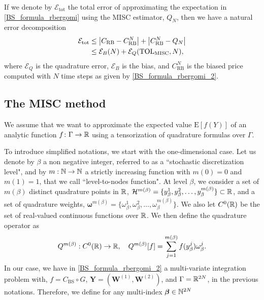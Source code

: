 If we denote by $\mathcal{E}_{\text{tot}}$ the total error of approximating the  expectation in \eqref{BS_formula_rbergomi} using the MISC estimator, $Q_N$, then we have a natural error decomposition
\begin{align}\label{eq:total_error}
\mathcal{E}_{\text{tot}} & \le \left\lvert C_{\text{RB}}-C_{\text{RB}}^N\right\rvert+\left\lvert C_{\text{RB}}^N-Q_{N}\right\rvert\nonumber\\
  & \le \mathcal{E}_B(N)+ \mathcal{E}_Q(\text{TOL}_{\text{MISC}},N),
\end{align}
where  $\mathcal{E}_Q$ is the quadrature error, $\mathcal{E}_B$  is the bias, and $C_{\text{RB}}^N$ is the biased price computed with $N$ time steps as given by \eqref{BS_formula_rbergomi_2}.

\subsection{The MISC method}\label{sec:Details of the MISC}

We assume that we want to approximate the expected value $\text{E}[f(Y)]$ of an analytic function $f\colon \Gamma \to \mathbb{R}$ using a tensorization of quadrature formulas over $\Gamma$.

To introduce simplified notations, we start with the one-dimensional case. Let us denote by $\beta$ a non negative integer, referred to as a ``stochastic discretization level", and by $m: \mathbb{N} \rightarrow \mathbb{N}$  a strictly increasing function with $m(0)=0$ and $m(1)=1$, that we call  ``level-to-nodes function". At level $\beta$, we consider a set of $m(\beta)$ distinct quadrature points in $\mathbb{R}$, $\mathcal{H}^{m(\beta)}=\{y^1_\beta,y^2_\beta,\dots,y_\beta^{m(\beta)}\} \subset \mathbb{R}$, and a set of quadrature weights, $\boldsymbol{\omega}^{m(\beta)}=\{\omega^1_\beta,\omega^2_\beta,\dots,\omega_\beta^{m(\beta)}\}$. We also let $C^0(\mathbb{R})$ be the set of real-valued continuous functions over $\mathbb{R}$. We then define the quadrature operator as
\begin{equation}
Q^{m(\beta)}:C^0(\mathbb{R}) \rightarrow \mathbb{R}, \quad Q^{m(\beta)}[f]= \sum_{j=1}^{m(\beta)} f(y^j_\beta) \omega_\beta^j.
\end{equation}
In our case, we have in \eqref{BS_formula_rbergomi_2} a multi-variate integration problem with,  $f=C_{\text{BS}}\circ G$, $\mathbf{Y}=(\mathbf{W}^{(1)},\mathbf{W}^{(2)})$, and  $\Gamma=\mathbb{R}^{2N}$, in the previous notations.  Therefore,  we define for any multi-index $\boldsymbol{\beta} \in \mathbb{N}^{2N}$

